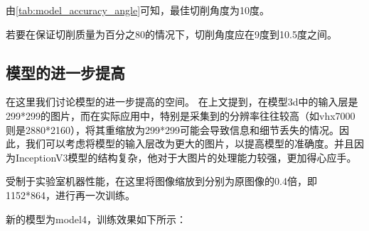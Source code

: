     由\autoref{tab:model_accuracy_angle}可知，最佳切削角度为10度。

    若要在保证切削质量为百分之80的情况下，切削角度应在9度到10.5度之间。


\subsection{模型的进一步提高}

在这里我们讨论模型的进一步提高的空间。
在上文提到，在模型3d中的输入层是299*299的图片，而在实际应用中，特别是采集到的分辨率往往较高（如vhx7000则是2880*2160），将其重缩放为299*299可能会导致信息和细节丢失的情况。因此，我们可以考虑将模型的输入层改为更大的图片，以提高模型的准确度。并且因为InceptionV3模型的结构复杂，他对于大图片的处理能力较强，更加得心应手。

受制于实验室机器性能，在这里将图像缩放到分别为原图像的0.4倍，即1152*864，进行再一次训练。

新的模型为model4，训练效果如下所示：

